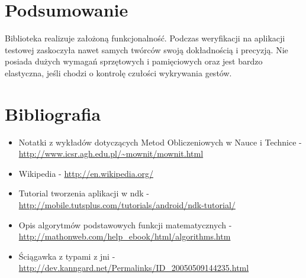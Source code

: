 \documentclass[a4paper,12pt]{article}
\begin{document}


\section{Podsumowanie}
Biblioteka realizuje założoną funkcjonalność. Podczas weryfikacji na aplikacji testowej zaskoczyła nawet samych twórców swoją dokładnością i precyzją. Nie posiada dużych wymagań sprzętowych i pamięciowych oraz jest bardzo elastyczna, jeśli chodzi o kontrolę czułości wykrywania gestów.

\section{Bibliografia}
\begin{itemize}
\item Notatki z wykładów dotyczących Metod Obliczeniowych w Nauce i Technice - \url{http://www.icsr.agh.edu.pl/~mownit/mownit.html}
\item Wikipedia - \url{http://en.wikipedia.org/}
\item Tutorial tworzenia aplikacji w ndk - \url{http://mobile.tutsplus.com/tutorials/android/ndk-tutorial/}
\item Opis algorytmów podstawowych funkcji matematycznych - \url{http://mathonweb.com/help_ebook/html/algorithms.htm}
\item Ściągawka z typami z jni - \url{http://dev.kanngard.net/Permalinks/ID_20050509144235.html} 
\end{itemize}
\end{document}
